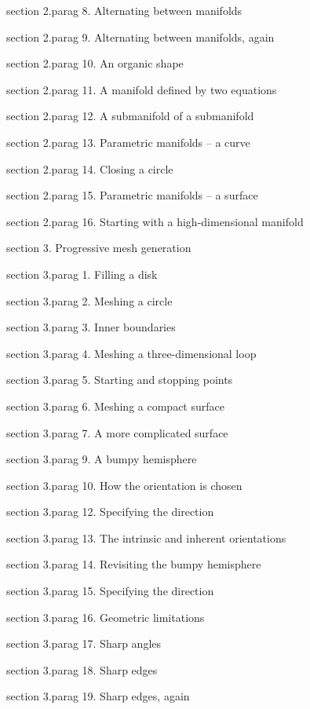 \numb section 2.\numb parag 8. Alternating between manifolds

\numb section 2.\numb parag 9. Alternating between manifolds, again

\numb section 2.\numb parag 10. An organic shape

\numb section 2.\numb parag 11. A manifold defined by two equations

\numb section 2.\numb parag 12. A submanifold of a submanifold

\numb section 2.\numb parag 13. Parametric manifolds -- a curve

\numb section 2.\numb parag 14. Closing a circle

\numb section 2.\numb parag 15. Parametric manifolds -- a surface

\numb section 2.\numb parag 16. Starting with a high-dimensional manifold


\medskip\noindent
\numb section 3. Progressive mesh generation

\numb section 3.\numb parag 1. Filling a disk

\numb section 3.\numb parag 2. Meshing a circle

\numb section 3.\numb parag 3. Inner boundaries

\numb section 3.\numb parag 4. Meshing a three-dimensional loop

\numb section 3.\numb parag 5. Starting and stopping points

\numb section 3.\numb parag 6. Meshing a compact surface

\numb section 3.\numb parag 7. A more complicated surface

\numb section 3.\numb parag 9. A bumpy hemisphere

\numb section 3.\numb parag 10. How the orientation is chosen

\numb section 3.\numb parag 12. Specifying the direction

\numb section 3.\numb parag 13. The intrinsic and inherent orientations

\numb section 3.\numb parag 14. Revisiting the bumpy hemisphere

\numb section 3.\numb parag 15. Specifying the direction

\numb section 3.\numb parag 16. Geometric limitations

\numb section 3.\numb parag 17. Sharp angles

\numb section 3.\numb parag 18. Sharp edges

\numb section 3.\numb parag 19. Sharp edges, again


